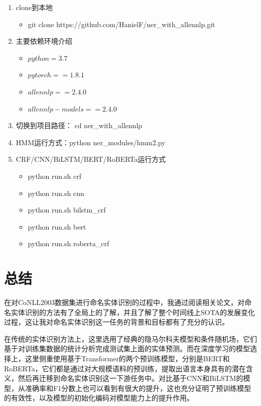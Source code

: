\documentclass[a4paper, 12pt]{article}
\begin{document}
\begin{enumerate}
    \item clone到本地
        \begin{itemize}
            \item git clone https://github.com/HanielF/ner\_with\_allennlp.git
        \end{itemize}
    \item 主要依赖环境介绍
        \begin{itemize}
            \item $python= 3.7$
            \item $pytorch== 1.8.1$
            \item $allennlp== 2.4.0$
            \item $allennlp-models==2.4.0$
        \end{itemize}
    \item 切换到项目路径： cd ner\_with\_allennlp
    \item HMM运行方式：python ner\_modules/hmm2.py
    \item CRF/CNN/BiLSTM/BERT/RoBERTa运行方式
        \begin{itemize}
            \item python run.sh crf
            \item python run.sh cnn
            \item python run.sh bilstm\_crf
            \item python run.sh bert
            \item python run.sh roberta\_crf
        \end{itemize}
\end{enumerate}

\section{总结}

在对CoNLL2003数据集进行命名实体识别的过程中，我通过阅读相关论文，对命名实体识别的方法有了全局上的了解，并且了解了整个时间线上SOTA的发展变化过程，这让我对命名实体识别这一任务的背景和目标都有了充分的认识。

在传统的实体识别方法上，这里选用了经典的隐马尔科夫模型和条件随机场，它们基于对训练集数据的统计分析完成测试集上面的实体预测。而在深度学习的模型选择上，这里侧重使用基于Transformer的两个预训练模型，分别是BERT和RoBERTa，它们都是通过对大规模语料的预训练，提取出语言本身具有的潜在含义，然后再迁移到命名实体识别这一下游任务中。对比基于CNN和BiLSTM的模型，从准确率和F1分数上也可以看到有很大的提升，这也充分证明了预训练模型的有效性，以及模型的初始化编码对模型能力上的提升作用。


% 
% 
\end{document}
